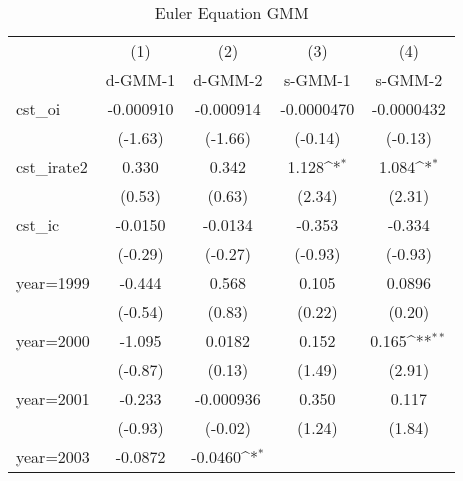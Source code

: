 \begin{table}[htbp]\centering
\def\sym#1{\ifmmode^{#1}\else\(^{#1}\)\fi}
\caption{Euler Equation GMM}
\begin{tabular}{l*{4}{c}}
\toprule
                    &\multicolumn{1}{c}{(1)}&\multicolumn{1}{c}{(2)}&\multicolumn{1}{c}{(3)}&\multicolumn{1}{c}{(4)}\\
                    &\multicolumn{1}{c}{d-GMM-1}&\multicolumn{1}{c}{d-GMM-2}&\multicolumn{1}{c}{s-GMM-1}&\multicolumn{1}{c}{s-GMM-2}\\
\midrule
cst\_oi              &   -0.000910         &   -0.000914         &  -0.0000470         &  -0.0000432         \\
                    &     (-1.63)         &     (-1.66)         &     (-0.14)         &     (-0.13)         \\
\addlinespace
cst\_irate2          &       0.330         &       0.342         &       1.128\sym{*}  &       1.084\sym{*}  \\
                    &      (0.53)         &      (0.63)         &      (2.34)         &      (2.31)         \\
\addlinespace
cst\_ic              &     -0.0150         &     -0.0134         &      -0.353         &      -0.334         \\
                    &     (-0.29)         &     (-0.27)         &     (-0.93)         &     (-0.93)         \\
\addlinespace
year=1999           &      -0.444         &       0.568         &       0.105         &      0.0896         \\
                    &     (-0.54)         &      (0.83)         &      (0.22)         &      (0.20)         \\
\addlinespace
year=2000           &      -1.095         &      0.0182         &       0.152         &       0.165\sym{**} \\
                    &     (-0.87)         &      (0.13)         &      (1.49)         &      (2.91)         \\
\addlinespace
year=2001           &      -0.233         &   -0.000936         &       0.350         &       0.117         \\
                    &     (-0.93)         &     (-0.02)         &      (1.24)         &      (1.84)         \\
\addlinespace
year=2003           &     -0.0872         &     -0.0460\sym{*}  &                     &                     \\

\end{tabular}
\end{table}
